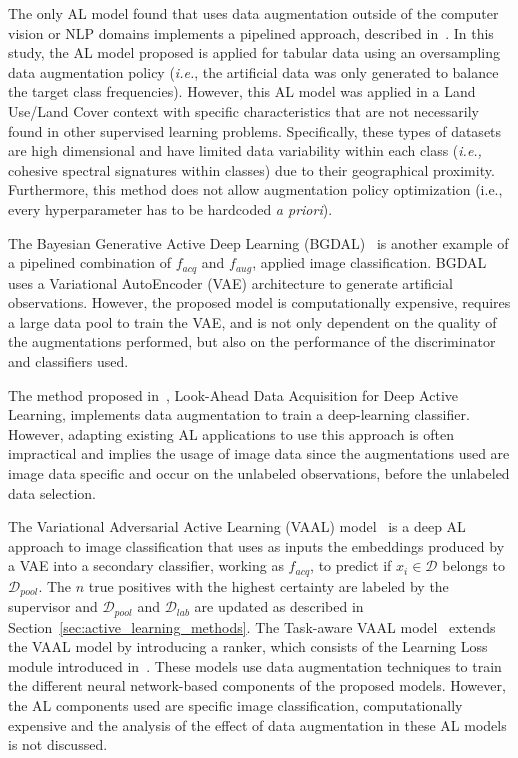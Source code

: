 \documentclass[10pt,journal,compsoc]{IEEEtran}
\begin{document}
The only AL model found that uses data augmentation outside of the computer
vision or NLP domains implements a pipelined approach, described
in~\cite{Fonseca2021}. In this study, the AL model proposed is applied for
tabular data using an oversampling data augmentation policy (\textit{i.e.},
the artificial data was only generated to balance the target class
frequencies). However, this AL model was applied in a Land Use/Land Cover
context with specific characteristics that are not necessarily found in other
supervised learning problems. Specifically, these types of datasets are high
dimensional and have limited data variability within each class
(\textit{i.e.,} cohesive spectral signatures within classes) due to their
geographical proximity. Furthermore, this method does not allow augmentation
policy optimization (i.e., every hyperparameter has to be hardcoded \textit{a
priori}).

The Bayesian Generative Active Deep Learning (BGDAL)~\cite{tran2019bayesian}
is another example of a pipelined combination of $f_{acq}$ and $f_{aug}$,
applied image classification. BGDAL uses a Variational AutoEncoder (VAE)
architecture to generate artificial observations. However, the proposed model
is computationally expensive, requires a large data pool to train the VAE, and
is not only dependent on the quality of the augmentations performed, but also
on the performance of the discriminator and classifiers used.

The method proposed in~\cite{Kim2021}, Look-Ahead Data Acquisition for Deep
Active Learning, implements data augmentation to train a deep-learning
classifier. However, adapting existing AL applications to use this approach is
often impractical and implies the usage of image data since the augmentations
used are image data specific and occur on the unlabeled observations, before
the unlabeled data selection.

The Variational Adversarial Active Learning (VAAL)
model~\cite{sinha2019variational} is a deep AL approach to image
classification that uses as inputs the embeddings produced by a VAE into a
secondary classifier, working as $f_{acq}$, to predict if $x_i \in
\mathcal{D}$ belongs to $\mathcal{D}_{pool}$. The $n$ true positives with the
highest certainty are labeled by the supervisor and $\mathcal{D}_{pool}$ and
$\mathcal{D}_{lab}$ are updated as described in
Section~\ref{sec:active_learning_methods}. The Task-aware VAAL
model~\cite{kim2021task} extends the VAAL model by introducing a ranker, which
consists of the Learning Loss module introduced in~\cite{Yoo2019}. These
models use data augmentation techniques to train the different neural
network-based components of the proposed models. However, the AL components
used are specific image classification, computationally expensive and the
analysis of the effect of data augmentation in these AL models is not
discussed.
\end{document}
